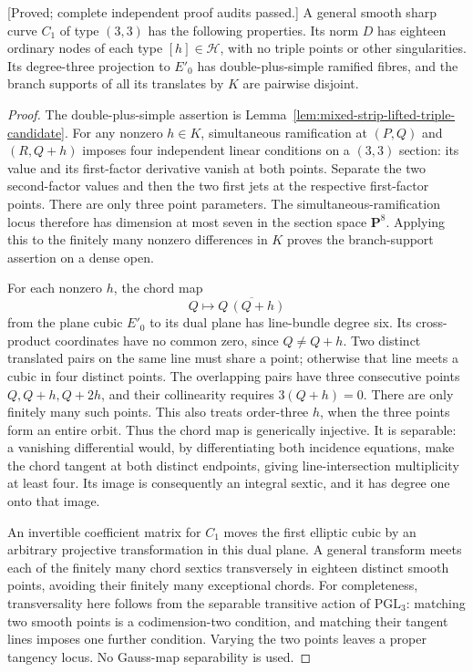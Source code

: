 \begin{lemma}
\label{lem:mixed-odd-all-translated-small-source-candidate}
\textup{[Proved; complete independent proof audits passed.]}
A general smooth sharp curve $C_1$ of type $(3,3)$ has the following
properties. Its norm $D$ has eighteen ordinary nodes of each type
$[h]\in\mathcal H$, with no triple points or other singularities.
Its degree-three projection to $E'_0$ has double-plus-simple ramified
fibres, and the branch supports of all its translates by $K$ are
pairwise disjoint.
\end{lemma}
\begin{proof}
The double-plus-simple assertion is
Lemma~\ref{lem:mixed-strip-lifted-triple-candidate}.
For any nonzero $h\in K$, simultaneous ramification at
$(P,Q)$ and $(R,Q+h)$ imposes four independent linear conditions
on a $(3,3)$ section: its value and its first-factor derivative
vanish at both points. Separate the two second-factor values and
then the two first jets at the respective first-factor points.
There are only three point parameters. The simultaneous-ramification
locus therefore has dimension at most seven in the section space
$\mathbf P^8$. Applying this to the finitely many nonzero differences
in $K$ proves the branch-support assertion on a dense open.

For each nonzero $h$, the chord map
\[
 Q\longmapsto \overline{Q\,(Q+h)}
\]
from the plane cubic $E'_0$ to its dual plane has line-bundle degree
six. Its cross-product coordinates have no common zero, since
$Q\ne Q+h$. Two distinct translated pairs on the same line must
share a point; otherwise that line meets a cubic in four distinct
points. The overlapping pairs have three consecutive points
$Q,Q+h,Q+2h$, and their collinearity requires $3(Q+h)=0$.
There are only finitely many such points. This also treats order-three
$h$, when the three points form an entire orbit. Thus the chord map
is generically injective. It is separable: a vanishing differential
would, by differentiating both incidence equations, make the chord
tangent at both distinct endpoints, giving line-intersection
multiplicity at least four. Its image is consequently an integral
sextic, and it has degree one onto that image.

An invertible coefficient matrix for $C_1$ moves the first elliptic
cubic by an arbitrary projective transformation in this dual plane.
A general transform meets each of the finitely many chord sextics
transversely in eighteen distinct smooth points, avoiding their
finitely many exceptional chords. For completeness, transversality
here follows from the separable transitive action of
$\mathrm{PGL}_3$: matching two smooth points is a codimension-two
condition, and matching their tangent lines imposes one further
condition. Varying the two points leaves a proper tangency locus.
No Gauss-map separability is used.


\end{proof}
